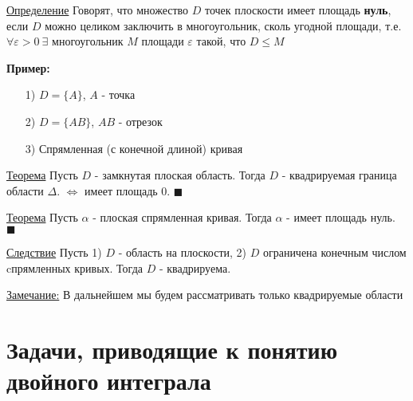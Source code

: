 \documentclass[a4paper, 14pt]{report}
\begin{document}
	\hfill
	
	\underline{Определение} Говорят, что множество $D$ точек плоскости имеет площадь \textbf{нуль}, если $D$ можно целиком заключить в многоугольник, сколь угодной площади, т.е. $\forall \varepsilon > 0\ \exists$ многоугольник $M$ площади $\varepsilon$ такой, что $D \le M$
	
	\hfill
	
	\textbf{Пример:}
	\begin{enumerate}
		\item[1)] $D = \{ A \}$, $A$ - точка
		\item[2)] $D = \{ AB \}$, $AB$ - отрезок
		\item[3)] Спрямленная (с конечной длиной) кривая
	\end{enumerate}
	
	\underline{Теорема} Пусть $D$ - замкнутая плоская область. Тогда $D$ - квадрируемая граница области $\Delta$. $\Leftrightarrow$ имеет площадь 0. $\blacksquare$
	
	\hfill
	
	\underline{Теорема} Пусть $\alpha$ - плоская спрямленная кривая. Тогда $\alpha$ - имеет площадь нуль. $\blacksquare$
	
	\hfill
	
	\underline{Следствие} Пусть 1) $D$ - область на плоскости, 2) $D$ ограничена конечным числом cпрямленных кривых. Тогда $D$ - квадрируема.
	
	\hfill
	
	\underline{Замечание:} В дальнейшем мы будем рассматривать только квадрируемые области
	
	\section{Задачи, приводящие к понятию двойного интеграла}
	
\end{document}
